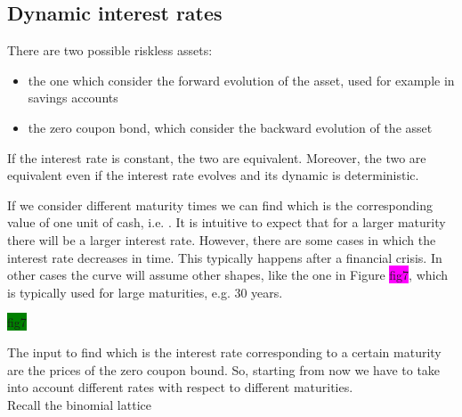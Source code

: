 \subsection{Dynamic interest rates}
\begin{remark}
There are two possible riskless assets: 
\begin{itemize}
    \item the one which consider the forward evolution of the asset, used for example in savings accounts
    \item the zero coupon bond, which consider the backward evolution of the asset
\end{itemize}
If the interest rate is constant, the two are equivalent. Moreover, the two are equivalent even if the interest rate evolves and its dynamic is deterministic.
\end{remark}
\noindent If we consider different maturity times we can find which is the corresponding value of one unit of cash, i.e. . It is intuitive to expect that for a larger maturity there will be a larger interest rate. However, there are some cases in which the interest rate decreases in time. This typically happens after a financial crisis. In other cases the curve will assume other shapes, like the one in Figure \colorbox{magenta}{fig7}, which is typically used for large maturities, e.g. 30 years.
\begin{center}
    \colorbox{green}{fig7}
\end{center}
The input to find which is the interest rate corresponding to a certain maturity are the prices of the zero coupon bound. So, starting from now we have to take into account different rates with respect to different maturities. \\
Recall the binomial lattice
\begin{center}
\end{center}

